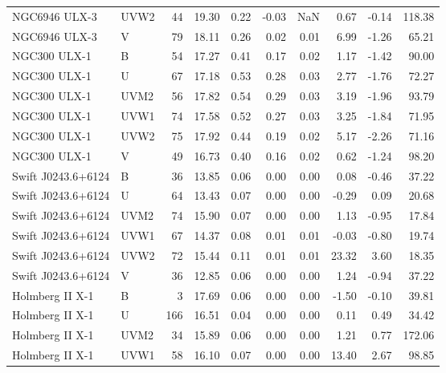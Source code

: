 \begin{tabular}{llrrrrrrrr}
     NGC6946 ULX-3 &   UVW2 &     44 & 19.30 & 0.22 &     -0.03 &    NaN &      0.67 & -0.14 &       118.38 \\
     NGC6946 ULX-3 &      V &     79 & 18.11 & 0.26 &      0.02 &   0.01 &      6.99 & -1.26 &        65.21 \\
      NGC300 ULX-1 &      B &     54 & 17.27 & 0.41 &      0.17 &   0.02 &      1.17 & -1.42 &        90.00 \\
      NGC300 ULX-1 &      U &     67 & 17.18 & 0.53 &      0.28 &   0.03 &      2.77 & -1.76 &        72.27 \\
      NGC300 ULX-1 &   UVM2 &     56 & 17.82 & 0.54 &      0.29 &   0.03 &      3.19 & -1.96 &        93.79 \\
      NGC300 ULX-1 &   UVW1 &     74 & 17.58 & 0.52 &      0.27 &   0.03 &      3.25 & -1.84 &        71.95 \\
      NGC300 ULX-1 &   UVW2 &     75 & 17.92 & 0.44 &      0.19 &   0.02 &      5.17 & -2.26 &        71.16 \\
      NGC300 ULX-1 &      V &     49 & 16.73 & 0.40 &      0.16 &   0.02 &      0.62 & -1.24 &        98.20 \\
Swift J0243.6+6124 &      B &     36 & 13.85 & 0.06 &      0.00 &   0.00 &      0.08 & -0.46 &        37.22 \\
Swift J0243.6+6124 &      U &     64 & 13.43 & 0.07 &      0.00 &   0.00 &     -0.29 &  0.09 &        20.68 \\
Swift J0243.6+6124 &   UVM2 &     74 & 15.90 & 0.07 &      0.00 &   0.00 &      1.13 & -0.95 &        17.84 \\
Swift J0243.6+6124 &   UVW1 &     67 & 14.37 & 0.08 &      0.01 &   0.01 &     -0.03 & -0.80 &        19.74 \\
Swift J0243.6+6124 &   UVW2 &     72 & 15.44 & 0.11 &      0.01 &   0.01 &     23.32 &  3.60 &        18.35 \\
Swift J0243.6+6124 &      V &     36 & 12.85 & 0.06 &      0.00 &   0.00 &      1.24 & -0.94 &        37.22 \\
   Holmberg II X-1 &      B &      3 & 17.69 & 0.06 &      0.00 &   0.00 &     -1.50 & -0.10 &        39.81 \\
   Holmberg II X-1 &      U &    166 & 16.51 & 0.04 &      0.00 &   0.00 &      0.11 &  0.49 &        34.42 \\
   Holmberg II X-1 &   UVM2 &     34 & 15.89 & 0.06 &      0.00 &   0.00 &      1.21 &  0.77 &       172.06 \\
   Holmberg II X-1 &   UVW1 &     58 & 16.10 & 0.07 &      0.00 &   0.00 &     13.40 &  2.67 &        98.85 \\

\end{tabular}
